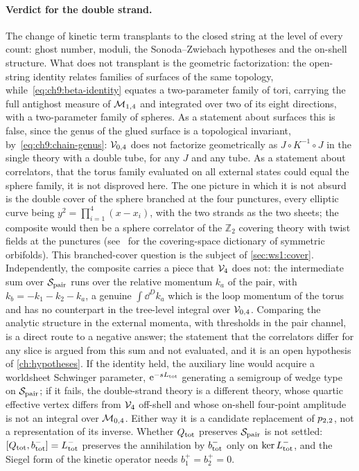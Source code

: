 \paragraph{Verdict for the double strand.}
The change of kinetic term transplants to the closed string at the level of every count: ghost number, moduli, the Sonoda--Zwiebach hypotheses and the on-shell structure.
What does not transplant is the geometric factorization: the open-string identity relates families of surfaces of the same topology, while~\eqref{eq:ch9:beta-identity} equates a two-parameter family of tori, carrying the full antighost measure of ${\mathcal{M}}_{1, 4}$ and integrated over two of its eight directions, with a two-parameter family of spheres.
As a statement about surfaces this is false, since the genus of the glued surface is a topological invariant, by~\eqref{eq:ch9:chain-genus}: ${\mathcal{V}}_{0, 4}$ does not factorize geometrically as $J \circ K^{-1} \circ J$ in the single theory with a double tube, for any $J$ and any tube.
As a statement about correlators, that the torus family evaluated on all external states could equal the sphere family, it is not disproved here.
The one picture in which it is not absurd is the double cover of the sphere branched at the four punctures, every elliptic curve being $y^2 = \prod_{i = 1}^4 (x - x_i)$, with the two strands as the two sheets; the composite would then be a sphere correlator of the $\mathbb Z_2$ covering theory with twist fields at the punctures (see~ for the covering-space dictionary of symmetric orbifolds).
This branched-cover question is the subject of \cref{sec:ws1:cover}.
Independently, the composite carries a piece that $\mathcal{V}_{4}$ does not: the intermediate sum over ${\mathcal{S}}_{\rm pair}$ runs over the relative momentum $k_a$ of the pair, with $k_b = - k_1 - k_2 - k_a$, a genuine $\int \dd^D k_a$ which is the loop momentum of the torus and has no counterpart in the tree-level integral over ${\mathcal{V}}_{0, 4}$.
Comparing the analytic structure in the external momenta, with thresholds in the pair channel, is a direct route to a negative answer; the statement that the correlators differ for any slice is argued from this sum and not evaluated, and it is an open hypothesis of \cref{ch:hypotheses}.
If the identity held, the auxiliary line would acquire a worldsheet Schwinger parameter, $\mathrm{e}^{- s L_{\rm tot}}$ generating a semigroup of wedge type on ${\mathcal{S}}_{\rm pair}$; if it fails, the double-strand theory is a different theory, whose quartic effective vertex differs from $\mathcal{V}_{4}$ off-shell and whose on-shell four-point amplitude is not an integral over ${\mathcal{M}}_{0, 4}$.
Either way it is a candidate replacement of $p_{2,2}$, not a representation of its inverse.
Whether $Q_{\rm tot}$ preserves ${\mathcal{S}}_{\rm pair}$ is not settled: $[Q_{\rm tot}, b^-_{\rm tot}] = L^-_{\rm tot}$ preserves the annihilation by $b^-_{\rm tot}$ only on $\ker L^-_{\rm tot}$, and the Siegel form of the kinetic operator needs $b_1^+ = b_2^+ = 0$.

